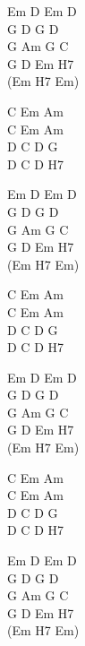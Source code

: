 \begin{chord}
Em D Em D\\
G D G D\\
G Am G C\\
G D Em H7\\
(Em H7 Em)

C Em Am\\
C Em Am\\
D C D G\\
D C D H7

Em D Em D\\
G D G D\\
G Am G C\\
G D Em H7\\
(Em H7 Em)

C Em Am\\
C Em Am\\
D C D G\\
D C D H7

Em D Em D\\
G D G D\\
G Am G C\\
G D Em H7\\
(Em H7 Em)

C Em Am\\
C Em Am\\
D C D G\\
D C D H7

Em D Em D\\
G D G D\\
G Am G C\\
G D Em H7\\
(Em H7 Em)
\end{chord}
